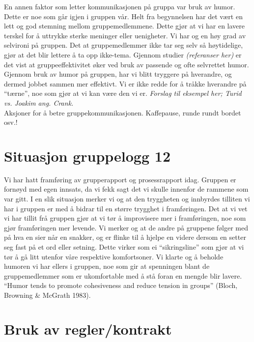 En annen faktor som letter kommunikasjonen på gruppa var bruk av humor. Dette er
noe som går igjen i gruppen vår. Helt fra begynnelsen har det vært en lett og
god stemning mellom gruppemedlemmene. Dette gjør at vi har en lavere terskel for
å uttrykke sterke meninger eller uenigheter. Vi har og en høy grad av selvironi
på gruppen. Det at gruppemedlemmer ikke tar seg selv så høytidelige, gjør at det
blir lettere å ta opp ikke-tema. Gjennom studier \emph{(referanser her)} er det
vist at gruppeeffektivitet øker ved bruk av passende og ofte selvrettet humor.
Gjennom bruk av humor på gruppen, har vi blitt tryggere på hverandre, og dermed
jobbet sammen mer effektivt. Vi er ikke redde for å tråkke hverandre på
``tærne'', noe som gjør at vi kan være den vi er. \emph{Forslag til eksempel
her; Turid vs. Joakim ang. Crank.} \\

Aksjoner for å betre gruppekommunikasjonen. Kaffepause, runde rundt bordet osv.!\\

\section{Situasjon gruppelogg 12}
Vi har hatt framføring av grupperapport og prosessrapport idag. Gruppen er fornøyd med egen innsats, da vi fekk sagt det vi skulle innenfor de rammene som var gitt. I en slik situasjon merker vi og at den tryggheten og innbyrdes tilliten vi har i gruppen er med å bidrar til en større trygghet i framføringen. Det at vi vet vi har tillit frå gruppen gjør at vi tør å improvisere mer i framføringen, noe som gjør framføringen mer levende. Vi merker og at de andre på gruppene følger med på hva en sier når en snakker, og er flinke til å hjelpe en videre dersom en setter seg fast på et ord eller setning. Dette virker som ei ``sikringsline'' som gjør at vi tør å gå litt utenfor våre respektive komfortsoner. Vi klarte og å beholde humoren vi har ellers i gruppen, noe som gir at spenningen blant de gruppemedlemmer som er ukomfortable med å stå foran en mengde blir lavere. ``Humor tends to promote cohesiveness and reduce tension in groups'' (Bloch, Browning \& McGrath 1983).\\


\section{Bruk av regler/kontrakt}

